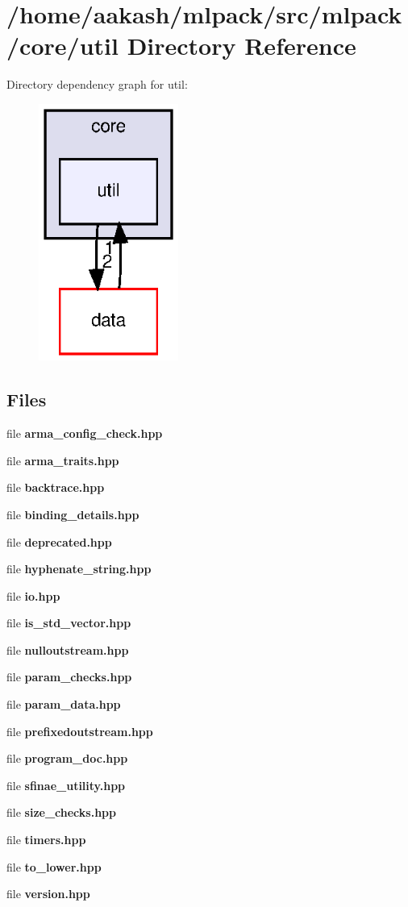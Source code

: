 \section{/home/aakash/mlpack/src/mlpack/core/util Directory Reference}
\label{dir_e173a4984165953811b5143e3b27486f}
Directory dependency graph for util\+:
\nopagebreak
\begin{figure}[H]
\begin{center}
\leavevmode
\includegraphics[width=130pt]{dir_e173a4984165953811b5143e3b27486f_dep}
\end{center}
\end{figure}
\subsection*{Files}
\begin{DoxyCompactItemize}
\item 
file \textbf{ arma\+\_\+config\+\_\+check.\+hpp}
\item 
file \textbf{ arma\+\_\+traits.\+hpp}
\item 
file \textbf{ backtrace.\+hpp}
\item 
file \textbf{ binding\+\_\+details.\+hpp}
\item 
file \textbf{ deprecated.\+hpp}
\item 
file \textbf{ hyphenate\+\_\+string.\+hpp}
\item 
file \textbf{ io.\+hpp}
\item 
file \textbf{ is\+\_\+std\+\_\+vector.\+hpp}
\item 
file \textbf{ nulloutstream.\+hpp}
\item 
file \textbf{ param\+\_\+checks.\+hpp}
\item 
file \textbf{ param\+\_\+data.\+hpp}
\item 
file \textbf{ prefixedoutstream.\+hpp}
\item 
file \textbf{ program\+\_\+doc.\+hpp}
\item 
file \textbf{ sfinae\+\_\+utility.\+hpp}
\item 
file \textbf{ size\+\_\+checks.\+hpp}
\item 
file \textbf{ timers.\+hpp}
\item 
file \textbf{ to\+\_\+lower.\+hpp}
\item 
file \textbf{ version.\+hpp}
\end{DoxyCompactItemize}
